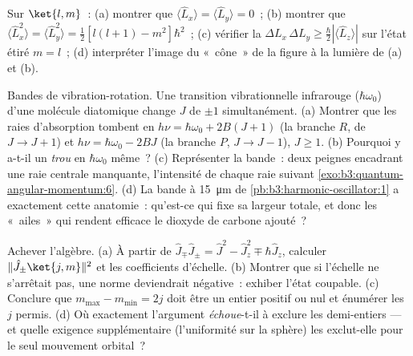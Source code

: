 \begin{exercise}[$\star\star$]\label{exo:b3:quantum-angular-momentum:9}
Sur $\ket{l, m}$~: (a) montrer que $\langle\hat L_x\rangle = \langle\hat
L_y\rangle = 0$~; (b) montrer que $\langle\hat L_x^2\rangle = \langle\hat
L_y^2\rangle = \tfrac12[l(l+1) - m^2]\hbar^2$~; (c) vérifier la
 $\Delta L_x\,\Delta L_y \ge \tfrac\hbar2
|\langle\hat L_z\rangle|$ sur l'état étiré $m = l$~; (d) interpréter
l'image du «~cône~» de la figure à la lumière de (a) et (b).
\end{exercise}

\begin{exercise}[$\star\star\star$]\label{exo:b3:quantum-angular-momentum:10}
Bandes de vibration-rotation. Une transition vibrationnelle
infrarouge ($\hbar\omega_0$) d'une molécule diatomique change $J$ de
$\pm1$ simultanément. (a) Montrer que les raies d'absorption tombent en $h\nu =
\hbar\omega_0 + 2B(J+1)$ (la branche $R$, de $J \to J+1$) et
$h\nu = \hbar\omega_0 - 2BJ$ (la branche $P$, $J \to J-1$), $J \ge
1$. (b) Pourquoi y a-t-il un \emph{trou} en $\hbar\omega_0$ même~? (c)
Représenter la bande~: deux peignes encadrant une raie centrale
manquante, l'intensité de chaque raie suivant
\cref{exo:b3:quantum-angular-momentum:6}. (d) La bande à
\qty{15}{\micro m} de \cref{pb:b3:harmonic-oscillator:1} a exactement
cette anatomie~: qu'est-ce qui fixe sa largeur totale, et donc les
«~ailes~» qui rendent efficace le dioxyde de carbone ajouté~?
\end{exercise}

\begin{exercise}[$\star\star\star$]\label{exo:b3:quantum-angular-momentum:11}
Achever l'algèbre. (a) À partir de $\hat J_\mp\hat J_\pm = \hat J^2 -
\hat J_z^2 \mp \hbar\hat J_z$, calculer $\|\hat J_\pm\ket{j,m}\|^2$
et les coefficients d'échelle. (b) Montrer que si l'échelle ne
s'arrêtait pas, une norme deviendrait négative~: exhiber l'état
coupable. (c) Conclure que $m_{\max} - m_{\min} = 2j$ doit être un
entier positif ou nul et énumérer les $j$ permis. (d) Où exactement
l'argument \emph{échoue}-t-il à exclure les demi-entiers --- et quelle
exigence supplémentaire (l'uniformité sur la sphère) les exclut-elle
pour le seul mouvement orbital~?
\end{exercise}

